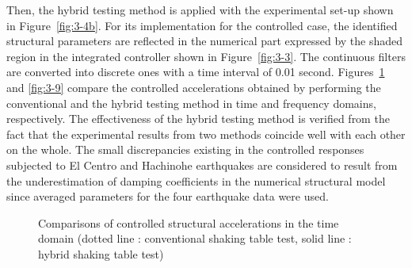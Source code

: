 Then, the hybrid testing method is applied with the experimental set-up shown in Figure~\ref{fig:3-4b}. For its implementation for the controlled case, the identified structural parameters are reflected in the numerical part expressed by the shaded region in the integrated controller shown in Figure~\ref{fig:3-3}. The continuous filters are converted into discrete ones with a time interval of 0.01 second. Figures~\ref{fig:3-8} and \ref{fig:3-9} compare the controlled accelerations obtained by performing the conventional and the hybrid testing method in time and frequency domains, respectively. The effectiveness of the hybrid testing method is verified from the fact that the experimental results from two methods coincide well with each other on the whole. The small discrepancies existing in the controlled responses subjected to El Centro and Hachinohe earthquakes are considered to result from the underestimation of damping coefficients in the numerical structural model since averaged parameters for the four earthquake data were used.

\begin{figure}[!ht]
\centering
\caption{Comparisons of controlled structural accelerations in the time domain
(dotted line : conventional shaking table test, solid line : hybrid shaking table test)
}
\label{fig:3-8}
\end{figure}

